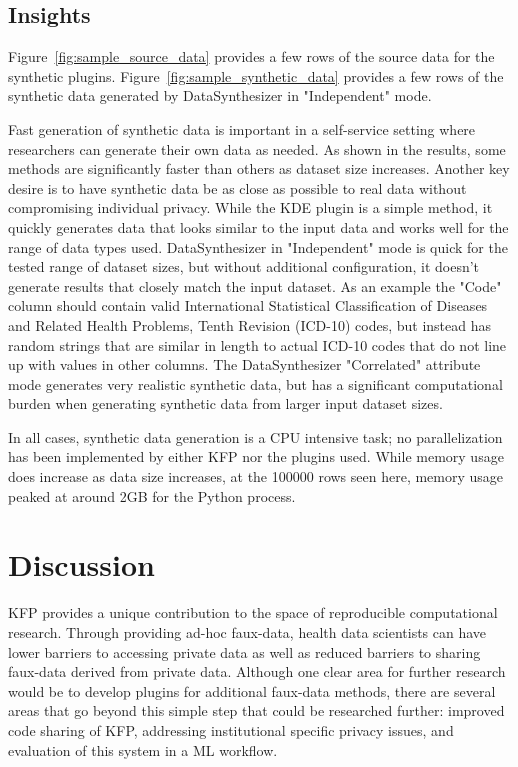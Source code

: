 \documentclass{amia}
\begin{document}
\subsection{Insights}

Figure~\ref{fig:sample_source_data} provides a few rows of the source data for the synthetic plugins. Figure~\ref{fig:sample_synthetic_data} provides a few rows of the synthetic data generated by DataSynthesizer in "Independent" mode.

Fast generation of synthetic data is important in a self-service setting where researchers can generate their own data as needed. As shown in the results, some methods are significantly faster than others as dataset size increases. Another key desire is to have synthetic data be as close as possible to real data without compromising individual privacy. While the KDE plugin is a simple method, it quickly generates data that looks similar to the input data and works well for the range of data types used. DataSynthesizer in "Independent" mode is quick for the tested range of dataset sizes, but without additional configuration, it doesn't generate results that closely match the input dataset. As an example the "Code" column should contain valid International Statistical Classification of Diseases and Related Health Problems, Tenth Revision (ICD-10) codes, but instead has random strings that are similar in length to actual ICD-10 codes that do not line up with values in other columns. The DataSynthesizer "Correlated" attribute mode generates very realistic synthetic data, but has a significant computational burden when generating synthetic data from larger input dataset sizes.

In all cases, synthetic data generation is a CPU intensive task; no parallelization has been implemented by either KFP nor the plugins used. While memory usage does increase as data size increases, at the 100000 rows seen here, memory usage peaked at around 2GB for the Python process.

\section{Discussion}

KFP provides a unique contribution to the space of reproducible computational research. Through providing ad-hoc faux-data, health data scientists can have lower barriers to accessing private data as well as reduced barriers to sharing faux-data derived from private data. Although one clear area for further research would be to develop plugins for additional faux-data methods, there are several areas that go beyond this simple step that could be researched further: improved code sharing of KFP, addressing institutional specific privacy issues, and evaluation of this system in a ML workflow.
\end{document}
